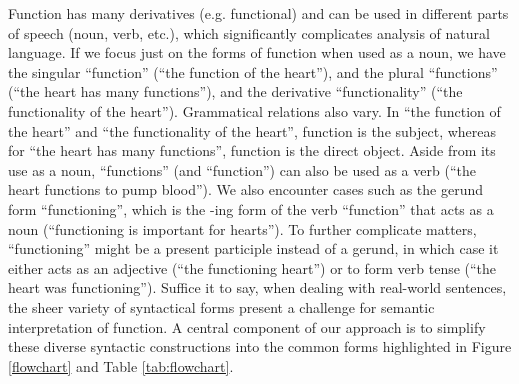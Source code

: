 \documentclass{article}
\begin{document}
Function has many derivatives (e.g. functional) and can be used in different parts of speech (noun, verb, etc.), which significantly complicates analysis of natural language.
If we focus just on the forms of function when used as a noun, we have the singular ``function'' (``the function of the heart''), and the plural ``functions'' (``the heart has many functions''), and the derivative ``functionality'' (``the functionality of the heart'').
Grammatical relations also vary.
In ``the function of the heart'' and ``the functionality of the heart'', function is the subject, whereas for ``the heart has many functions'', function is the direct object.
Aside from its use as a noun, ``functions'' (and ``function'') can also be used as a verb (``the heart functions to pump blood'').
We also encounter cases such as the gerund form ``functioning'', which is the -ing form of the verb ``function'' that acts as a noun (``functioning is important for hearts'').
To further complicate matters, ``functioning'' might be a present participle instead of a gerund, in which case it either acts as an adjective (``the functioning heart'') or to form verb tense (``the heart was functioning''). Suffice it to say, when dealing with real-world sentences, the sheer variety of syntactical forms present a challenge for semantic interpretation of function.
A central component of our approach is to simplify these diverse syntactic constructions into the common forms highlighted in Figure \ref{flowchart} and Table \ref{tab:flowchart}.
 
\end{document}
